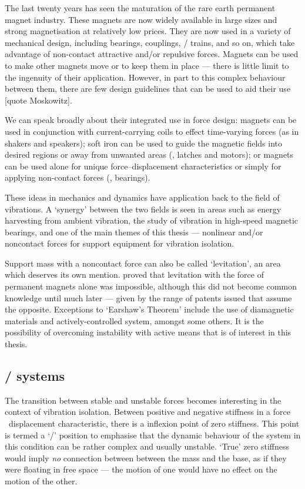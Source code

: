 The last twenty years has seen the maturation of the rare earth permanent magnet industry.
These magnets are now widely available in large sizes and strong magnetisation at relatively low prices.
They are now used in a variety of mechanical design, including bearings, couplings, \maglev/ trains, and so on, which take advantage of non-contact attractive and/or repulsive forces.
Magnets can be used to make other magnets move or to keep them in place — there is little limit to the ingenuity of their application.
However, in part to this complex behaviour between them, there are few design guidelines that can be used to aid their use [quote Moskowitz].

We can speak broadly about their integrated use in force design: magnets can be used in conjunction with current-carrying coils to effect time-varying forces (as in shakers and speakers); soft iron can be used to guide the magnetic fields into desired regions or away from unwanted areas (\eg, latches and motors); or magnets can be used alone for unique force--displacement characteristics or simply for applying non-contact forces (\eg, bearings).

These ideas in mechanics and dynamics have application back to the field of vibrations.
A `synergy' between the two fields is seen in areas such as energy harvesting from ambient vibration, the study of vibration in high-speed magnetic bearings, and one of the main themes of this thesis — nonlinear and/or noncontact forces for support equipment for vibration isolation.

Support mass with a noncontact force can also be called `levitation', an area which deserves its own mention.
\textcite{earnshaw1842} proved that levitation with the force of permanent magnets alone was impossible, although this did not become common knowledge  until much later — given by the range of patents issued that assume the opposite.
Exceptions to `Earshaw's Theorem' include the use of diamagnetic materials and actively-controlled system, amongst some others.
It is the possibility of overcoming instability with active means that is of interest in this thesis.

\subsection{\QZS/ systems}

The transition between stable and unstable forces becomes interesting in the context of vibration isolation.
Between positive and negative stiffness in a force \vs\ displacement characteristic, there is a inflexion point of zero stiffness.
This point is termed a `\qzs/' position to emphasise that the dynamic behaviour of the system in this condition can be rather complex and usually unstable.
`True' zero stiffness would imply \emph{no} connection between between the mass and the base, as if they were floating in free space — the motion of one would have no effect on the motion of the other.

